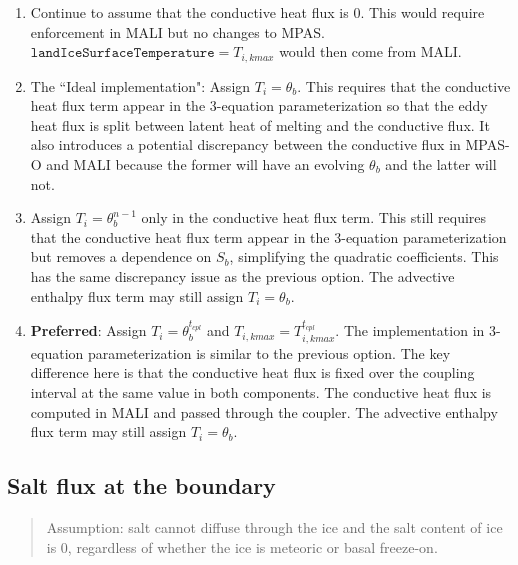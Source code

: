\documentclass[11pt]{report}
\begin{document}
\begin{enumerate}
    \item Continue to assume that the conductive heat flux is 0. This would require enforcement in MALI but no changes to MPAS. $\texttt{landIceSurfaceTemperature} = T_{i,kmax}$ would then come from MALI.
    \item The ``Ideal implementation": Assign $T_i = \theta_b$. This requires that the conductive heat flux term appear in the 3-equation parameterization so that the eddy heat flux is split between latent heat of melting and the conductive flux. It also introduces a potential discrepancy between the conductive flux in MPAS-O and MALI because the former will have an evolving $\theta_b$ and the latter will not.
    \item Assign $T_i = \theta_b^{n-1}$ only in the conductive heat flux term. This still requires that the conductive heat flux term appear in the 3-equation parameterization but removes a dependence on $S_b$, simplifying the quadratic coefficients. This has the same discrepancy issue as the previous option. The advective enthalpy flux term may still assign $T_i = \theta_b$.
    \item \textbf{Preferred}: Assign $T_i = \theta_b^{t_{cpl}}$ and $T_{i,kmax}=T_{i,kmax}^{t_{cpl}}$. The implementation in 3-equation parameterization is similar to the previous option. The key difference here is that the conductive heat flux is fixed over the coupling interval at the same value in both components. The conductive heat flux is computed in MALI and passed through the coupler. The advective enthalpy flux term may still assign $T_i = \theta_b$.
\end{enumerate}


\subsection{Salt flux at the boundary}

\begin{quote}
    Assumption: salt cannot diffuse through the ice and the salt content of ice is 0, regardless of whether the ice is meteoric or basal freeze-on.
\end{quote}
\end{document}
